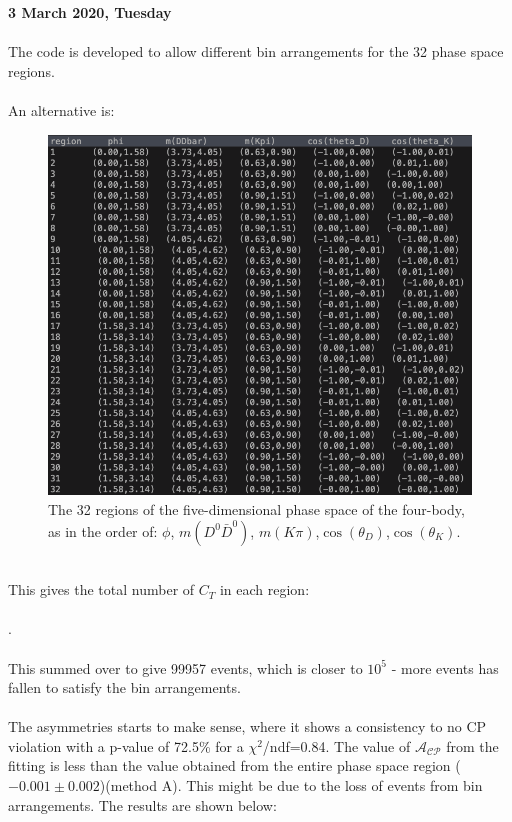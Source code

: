 \clearpage
\noindent\textbf{3 March 2020, Tuesday}
\\
\\
The code is developed to allow different bin arrangements for the 32 phase space regions.
\\
\\
An alternative is:
\begin{figure}[h]
\center
\includegraphics*[width=0.76\linewidth]{binnedanalysis/phase_space_region2}
\caption{The 32 regions of the five-dimensional phase space of the four-body, as in the order of: $\phi$, $m(D^0\bar{D}^0)$, $m(K\pi)$,$\cos(\theta_D)$,$\cos(\theta_K)$.}
\label{phase_space2}
\end{figure}
\\
This gives the total number of $C_T$ in each region:
\\
\\
\seqsplit{$[1422, 2125, 2051, 2205, 1820, 2209, 1932, 2243, 2255, 1973, 2568, 2358, 1914, 1549, 1757, 1850, 775, 1085, 1078, 1185, 1006, 1128, 1037, 1308, 1131, 1067, 1306, 1240, 978, 729, 754, 902, 1222, 888, 908, 778, 1452, 1036, 1330, 1367, 1156, 1440, 971, 1031, 1070, 1133, 980, 987, 2222, 1526, 1732, 1444, 2671, 1867, 2526, 2392, 2303, 2732, 1844, 1961, 1872, 2238, 1979, 1959]$}.
\\
\\
This summed over to give 99957 events, which is closer to $10^5$ - more events has fallen to satisfy the bin arrangements. 
\\
\\
The asymmetries starts to make sense, where it shows a consistency to no CP violation with a p-value of 72.5\% for a $\chi^2$/ndf=0.84. The value of $\mathcal{A}_{\mathcal{C}\mathcal{P}}$ from the fitting is less than the value obtained from the entire phase space region ($-0.001\pm0.002$)(method A). This might be due to the loss of events from bin arrangements. The results are shown below:
